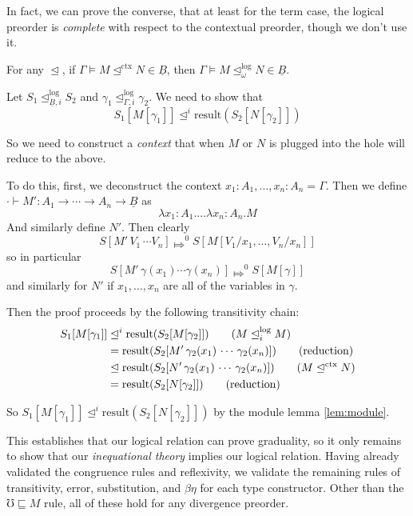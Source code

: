 \documentclass[acmsmall,nonacm]{acmart}
\renewcommand{\u}{\underline}
\newcommand{\ltdyn}{\sqsubseteq}
\newcommand{\apreorder}{\trianglelefteq}
\newcommand{\ctxize}[1]{\mathrel{{#1}^{\text{ctx}}}}
\newcommand{\ix}[2]{\mathrel{#1^{#2}}}
\newcommand{\itylrof}[3]{\ilrof{#1}{#3,#2}}
\newcommand{\ilrof}[2]{\mathrel{{#1}^{\text{log}}_{#2}}}
\newcommand{\itylr}[2]{\itylrof{\apreorder}{#1}{#2}}
\newcommand{\ilr}[1]{\ilrof{\apreorder}{#1}}
\newcommand{\bigstepsin}[1]{\mathrel{\Mapsto^{#1}}}
\newcommand{\err}{\mho}
\newcommand{\result}{\text{result}}
\begin{document}
{\begin{longonly}
In fact, we can prove the converse, that at least for the term case,
the logical preorder is \emph{complete} with respect to the contextual
preorder, though we don't use it.
\begin{lemma}
  For any $\apreorder$, if $\Gamma \vDash M \ctxize \apreorder N \in
  \u B$, then $\Gamma \vDash M \ilrof\apreorder \omega N \in \u B$.
\end{lemma}
\begin{longproof}
  Let $S_1 \itylr i {\u B} S_2$ and $\gamma_1 \itylr i \Gamma \gamma_2$. We need to show that
  \[
  S_1[M[\gamma_1]] \ix\apreorder i \result(S_2[N[\gamma_2]])
  \]

  So we need to construct a \emph{context} that when $M$ or $N$ is
  plugged into the hole will reduce to the above.

  To do this, first, we deconstruct the context
  $x_1:A_1,\ldots,x_n:A_n = \Gamma$.  Then we define $\cdot \vdash M'
  : A_1\to \cdots \to A_n \to \u B$ as
  \[ \lambda x_1:A_1.\ldots\lambda x_n:A_n. M \]
  And similarly define $N'$. Then clearly
  \[ S[M' \,V_1\, \cdots V_n] \bigstepsin{0} S[M[V_1/x_1,\ldots,V_n/x_n]] \]
  so in particular
  \[ S[M'\,\gamma(x_1)\cdots\gamma(x_n)] \bigstepsin{0} S[M[\gamma]]\]
  and similarly for $N'$ if $x_1,\ldots,x_n$ are all of the variables
  in $\gamma$.

  Then the proof proceeds by the following transitivity chain:
  \begin{align*}
    S_1[M[\gamma_1]] &\ix\apreorder i \result(S_2[M[\gamma_2]])\tag{$M \ilr i M$}\\
    &=\result(S_2[M'\,\gamma_2(x_1)\,\cdots\,\gamma_2(x_n)])\tag{reduction}\\
    &\apreorder \result(S_2[N'\,\gamma_2(x_1)\,\cdots\,\gamma_2(x_n)])\tag{$M \ctxize\apreorder N$}\\
    &= \result(S_2[N[\gamma_2]])\tag{reduction}
  \end{align*}

  So $S_1[M[\gamma_1]] \ix\apreorder i \result(S_2[N[\gamma_2]])$ by
  the module lemma \ref{lem:module}.
\end{longproof}
\end{longonly}

This establishes that our logical relation can prove graduality, so it
only remains to show that our \emph{inequational theory} implies our
logical relation.
%
Having already validated the congruence rules and reflexivity, we
validate the remaining rules of transitivity, error, substitution, and
$\beta\eta$ for each type constructor.
%
Other than the $\err \ltdyn M$ rule, all of these hold for any
divergence preorder.

}
\end{document}
